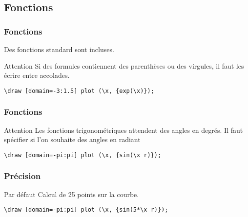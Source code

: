 \documentclass{clic_latex_beamer}
\begin{document}
\subsection{Fonctions}
\begin{frame}[fragile]
\frametitle{Fonctions}

Des fonctions standard sont incluses.

\begin{alertblock}{Attention}
 Si des formules contiennent des parenthèses ou des virgules, il faut les écrire entre accolades.\end{alertblock}

\begin{lstlisting}
\draw [domain=-3:1.5] plot (\x, {exp(\x)});
\end{lstlisting}


\end{frame}


\begin{frame}[fragile]
\frametitle{Fonctions}

\begin{alertblock}{Attention}
Les fonctions trigonométriques attendent des angles en degrés. Il faut spécifier si l'on souhaite des angles en radiant
\end{alertblock}

\begin{lstlisting}
\draw [domain=-pi:pi] plot (\x, {sin(\x r)});
\end{lstlisting}


\end{frame}


\begin{frame}[fragile]
\frametitle{Précision}

\begin{block}{Par défaut}
Calcul de 25 points sur la courbe.
\end{block}

\pause

\begin{lstlisting}
\draw [domain=-pi:pi] plot (\x, {sin(5*\x r)});
\end{lstlisting}


\end{frame}
\end{document}
